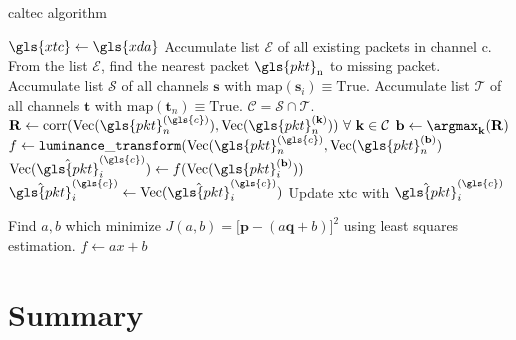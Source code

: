 \begin{algorithm}[H]
	\caption[CALTeC algorithm]{\gls{caltec} algorithm} \label{algo:caltec}
	\begin{algorithmic}
		\State $\gls{xtc} \gets \gls{xda}$
		 
		\Continue {}
		\Else
		 
		\State Accumulate list $\mathcal{E}$ of all existing packets in channel \gls{c}.
		\State From the list $\mathcal{E}$, find the nearest packet $\gls{pkt}_{\text{n}}$ to missing packet.
		\State Accumulate list $\mathcal{S}$ of all channels $\mathbf{s}$ with $\text{map}(\mathbf{s}_i) \equiv \text{True}$.
		\State Accumulate list $\mathcal{T}$ of all channels $\mathbf{t}$ with $\text{map}(\mathbf{t}_n) \equiv \text{True}$.
		\State $\mathcal{C} = \mathcal{S} \cap \mathcal{T}$. 
		 
		\Continue
		\EndIf
		\State $\mathbf{R} \gets \text{corr}(\text{Vec}(\gls{pkt}_n^{(\gls{c})}),\text{Vec}(\gls{pkt}_n^{(\mathbf{k})}))~\forall~ \mathbf{k} \in \mathcal{C}$ 
		\State $\mathbf{b} \gets \argmax_{\mathbf{k}}(\mathbf{R})$ 
		\State $f \gets \mathtt{luminance\_transform}(\text{Vec}(\gls{pkt}_n^{(\gls{c})},\text{Vec}(\gls{pkt}_n^{(\mathbf{b})})$
		\State $\text{Vec}(\hat{\gls{pkt}}_i^{(\gls{c})}) \gets f(\text{Vec}(\gls{pkt}_i^{(\mathbf{b})})) $
		\State $ \hat{\gls{pkt}}_i^{(\gls{c})} \gets \text{Vec}(\hat{\gls{pkt}}_i^{(\gls{c})})$ 
			\State Update \gls{xtc} with $\hat{\gls{pkt}}_i^{(\gls{c})}$
		\EndIf
		\EndFor 
		\EndIf
		
		\EndFor		
		\EndProcedure
		\State Find $a,b$ which minimize $J(a,b) = \big[\mathbf{p} - (a\mathbf{q}+b)\big]^2$ using least squares estimation.
		\State $f \gets ax + b$
		\EndProcedure
		\end{algorithmic}
\end{algorithm}

\section{Summary} \label{sec:caltec:summary} 

